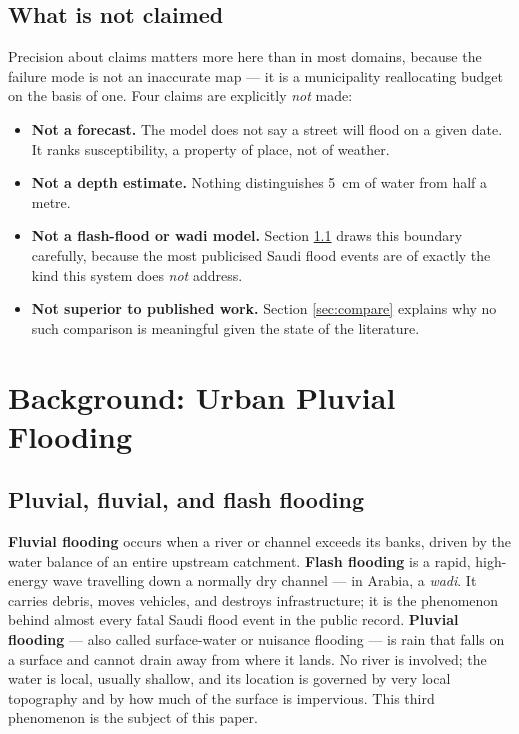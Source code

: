 \documentclass[11pt,a4paper]{article}
\begin{document}
\subsection{What is not claimed}
Precision about claims matters more here than in most domains, because the failure mode
is not an inaccurate map --- it is a municipality reallocating budget on the basis of
one. Four claims are explicitly \emph{not} made:

\begin{itemize}
  \item \textbf{Not a forecast.} The model does not say a street will flood on a given
        date. It ranks susceptibility, a property of place, not of weather.
  \item \textbf{Not a depth estimate.} Nothing distinguishes \SI{5}{\centi\metre} of
        water from half a metre.
  \item \textbf{Not a flash-flood or wadi model.} Section \ref{sec:types} draws this
        boundary carefully, because the most publicised Saudi flood events are of exactly
        the kind this system does \emph{not} address.
  \item \textbf{Not superior to published work.} Section \ref{sec:compare} explains why
        no such comparison is meaningful given the state of the literature.
\end{itemize}

\section{Background: Urban Pluvial Flooding}\label{sec:background}

\subsection{Pluvial, fluvial, and flash flooding}\label{sec:types}
\textbf{Fluvial flooding} occurs when a river or channel exceeds its banks, driven by
the water balance of an entire upstream catchment. \textbf{Flash flooding} is a rapid,
high-energy wave travelling down a normally dry channel --- in Arabia, a \emph{wadi}. It
carries debris, moves vehicles, and destroys infrastructure; it is the phenomenon behind
almost every fatal Saudi flood event in the public record. \textbf{Pluvial flooding} ---
also called surface-water or nuisance flooding --- is rain that falls on a surface and
cannot drain away from where it lands. No river is involved; the water is local, usually
shallow, and its location is governed by very local topography and by how much of the
surface is impervious. This third phenomenon is the subject of this paper.
\end{document}
